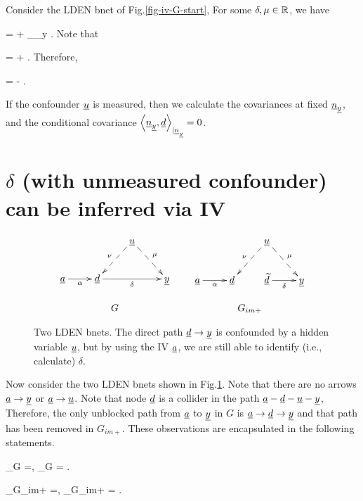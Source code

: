 Consider 
the LDEN bnet of Fig.\ref{fig-iv-G-start},
For some $\delta, \mu\in { \mathbb{R}}$, we have

\beq
\rvy = \delta \rvd +
\underbrace{ \mu \rvu + \rvu_\rvy}_{\rvn_y}
\;.
\eeq
Note that

\beq
\av{\rvy, \rvd} = \delta \av{\rvd, \rvd}
+ \av{\rvn_\rvy, \rvd}
\;.
\eeq
Therefore,

\beq
\delta =
-
\;.
\eeq  


If the confounder ${\underline{u}}$
is measured, then
we calculate 
the covariances at fixed ${\underline{n}}_{\underline{y}}$,
and 
the conditional covariance 
$\left\langle{\underline{n}}_{\underline{y}}, {\underline{d}}\right\rangle_{|{\underline{n}}_{\underline{y}}}=0$.

\section{$\delta$
(with unmeasured confounder)
can be
inferred via IV}



\begin{figure}[h!]
$$
\begin{array}{ccc}
\xymatrix{
&&\rvu\ar@{-->}[dl]_\nu\ar@{-->}[dr]^\mu
\\
\rva\ar[r]_\alpha
&\rvd\ar[rr]_\delta
&&\rvy
}
&&
\xymatrix{
&&\rvu\ar@{-->}[dl]_\nu\ar@{-->}[dr]^\mu
\\
\rva\ar[r]_\alpha
&\rvd&
\rvtd\ar[r]_\delta
&\rvy}
\\
\\
G&&G_{im+}
\end{array}
$$
\caption{
Two LDEN bnets. The direct path ${\underline{d}}\rightarrow{\underline{y}}$
is confounded by
a hidden variable ${\underline{u}}$, but
by using the IV ${\underline{a}}$, we are still
able to 
identify (i.e., calculate)
$\delta$.
}
\label{fig-iv-G-im}
\end{figure}

Now consider the two LDEN bnets 
shown in Fig.\ref{fig-iv-G-im}.
Note that there are no arrows
${\underline{a}}\rightarrow{\underline{y}}$
or 
${\underline{a}}\rightarrow{\underline{u}}$. Note that
node ${\underline{d}}$ is a collider
in the path 
${\underline{a}}-{\underline{d}}-{\underline{u}}-{\underline{y}}$, 
Therefore,
the only unblocked path
from ${\underline{a}}$ to 
${\underline{y}}$ in $G$ 
is ${\underline{a}}\rightarrow{\underline{d}}\rightarrow{\underline{y}}$
and that path has been
removed in $G_{im+}$. These
observations are 
encapsulated in the following statements.

\beq
\rvd\perp_{G} \rvy =, 
\;\; \rva\perp_{G} \rvy= 
\;.
\eeq

\beq
\rvd\perp_{G_{im+}} \rvy =, 
\;\; \rva\perp_{G_{im+}} \rvy= 
\;.
\eeq


